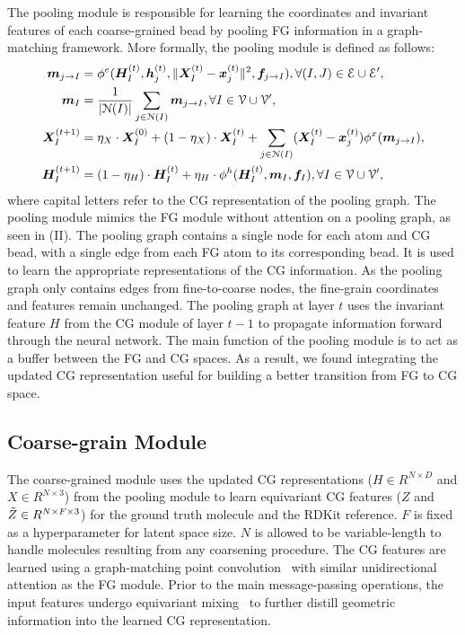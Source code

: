 The pooling module is responsible for learning the coordinates and invariant features of each coarse-grained bead by pooling FG information in a graph-matching framework. More formally, the pooling module is defined as follows:
\begin{equation}
\begin{aligned}
\bm{m}_{j\to I} &= \phi^e(\bm{H}_I^{(t)},\bm{h}_j^{(t)},\lVert\bm{X}_I^{(t)}-\bm{x}_j^{(t)}\rVert^2,\bm{f}_{j\to I}),\forall (I,J)\in {\mathcal{E}}\cup{\mathcal{E}}', \\
\bm{m}_I &= \frac{1}{|{\mathcal{N}}(I)|} \sum_{j\in{\mathcal{N}}(I)}\bm{m}_{j\to I},\forall I\in{\mathcal{V}}\cup{\mathcal{V}}', \\
\bm{X}_I^{(t+1)} &= \eta_X \cdot \bm{X}_I^{(0)} + (1 - \eta_X) \cdot \bm{X}_I^{(t)} + \sum_{j\in{\mathcal{N}}(I)} (\bm{X}_I^{(t)}-\bm{x}_j^{(t)})\phi^x(\bm{m}_{j\to I}), \\
\bm{H}_I^{(t+1)} &= (1 - \eta_H) \cdot \bm{H}_I^{(t)} + \eta_H \cdot \phi^h(\bm{H}_I^{(t)},\bm{m}_I, \bm{f}_I),\forall I\in{\mathcal{V}}\cup{\mathcal{V}}',
\end{aligned}
\end{equation}
where capital letters refer to the CG representation of the pooling graph.
The pooling module mimics the FG module without attention on a pooling graph, as seen in (II). The pooling graph contains a single node for each atom and CG bead, with a single edge from each FG atom to its corresponding bead. It is used to learn the appropriate representations of the CG information. As the pooling graph only contains edges from fine-to-coarse nodes, the fine-grain coordinates and features remain unchanged. The pooling graph at layer $t$ uses the invariant feature $H$ from the CG module of layer $t - 1$ to propagate information forward through the neural network. The main function of the pooling module is to act as a buffer between the FG and CG spaces. As a result, we found integrating the updated CG representation useful for building a better transition from FG to CG space.

\subsection{Coarse-grain Module}
\label{section:eqn-coarse}
The coarse-grained module uses the updated CG representations ($H\in R^{N\times D}$ and $X \in R^{N\times 3}$) from the pooling module to learn equivariant CG features ($Z$ and $\Tilde{Z} \in R^{N\times F \times 3}$) for the ground truth molecule and the RDKit reference. $F$ is fixed as a hyperparameter for latent space size. $N$ is allowed to be variable-length to handle molecules resulting from any coarsening procedure. 
The CG features are learned using a graph-matching point convolution~\citep{tensor-field-network} with similar unidirectional attention as the FG module. Prior to the main message-passing operations, the input features undergo equivariant mixing~\citep{3dlinker} to further distill geometric information into the learned CG representation.

